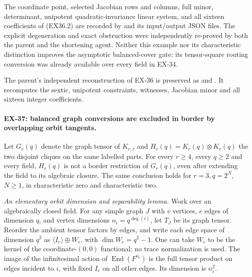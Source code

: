 The coordinate point, selected Jacobian rows and columns,
full minor, determinant, unipotent quadratic-invariance
linear system, and all sixteen coefficients of (EX36.2)
are recorded by  and its
input/output JSON files. The explicit degeneration and
exact obstruction were independently re-proved by both
the parent and the shortening agent. Neither this example
nor its characteristic distinction improves the asymptotic
balanced-cover gate: its tensor-square routing conversion
was already available over every field in EX-34.

The parent's independent reconstruction of EX-36 is preserved as
 and
.
It recomputes the sextic, unipotent constraints, witnesses,
Jacobian minor and all sixteen integer coefficients.

\paragraph{EX-37: balanced graph conversions are excluded in border by overlapping orbit tangents.}
Let $G_r(q)$ denote the graph tensor of $K_{r,r}$ and
$H_r(q)=K_r(q)\otimes K_r(q)$ the two disjoint cliques on
the same labelled parts. For every $r\ge4$, every $q\ge2$
and every field, $H_r(q)$ is not a border restriction of
$G_r(q)$, even after extending the field to its algebraic
closure. The same conclusion holds for $r=3,q=2^N$, $N\ge1$, in
characteristic zero and characteristic two.

\emph{An elementary orbit dimension and separability lemma.}
Work over an algebraically closed field. For any simple
graph $J$ with $v$ vertices, $e$ edges of dimension $q$, and
vertex dimensions $n_i=q^{\deg(i)}$, let $T_J$ be its graph
tensor. Reorder the ambient tensor factors by edges, and
write each edge space of dimension $q^2$ as
$\langle I_e\rangle\oplus W_e$, with
$\dim W_e=q^2-1$. One can take $W_e$ to be the kernel
of the coordinate-$(0,0)$ functional; no trace normalization
is used. The image of the infinitesimal action of
$\operatorname{End}(F^{n_i})$ is the full tensor product
on edges incident to $i$, with fixed $I_e$ on all other
edges. Its dimension is $n_i^2$.


